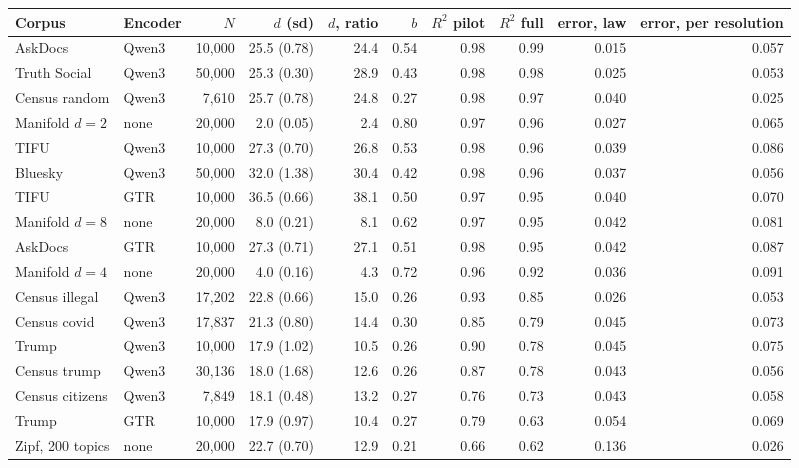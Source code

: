 \begin{table}[t]
\centering
\small
\setlength{\tabcolsep}{5pt}
\begin{tabular}{llrrrrrrrr}
\toprule
Corpus & Encoder & $N$ & $d$ (sd) & $d$, ratio & $b$ & $R^2$ pilot & $R^2$ full & error, law & error, per resolution \\
\midrule
AskDocs & Qwen3 & 10{,}000 & 25.5 (0.78) & 24.4 & 0.54 & 0.98 & 0.99 & 0.015 & 0.057 \\
Truth Social & Qwen3 & 50{,}000 & 25.3 (0.30) & 28.9 & 0.43 & 0.98 & 0.98 & 0.025 & 0.053 \\
Census random & Qwen3 & 7{,}610 & 25.7 (0.78) & 24.8 & 0.27 & 0.98 & 0.97 & 0.040 & 0.025 \\
Manifold $d{=}2$ & none & 20{,}000 & 2.0 (0.05) & 2.4 & 0.80 & 0.97 & 0.96 & 0.027 & 0.065 \\
TIFU & Qwen3 & 10{,}000 & 27.3 (0.70) & 26.8 & 0.53 & 0.98 & 0.96 & 0.039 & 0.086 \\
Bluesky & Qwen3 & 50{,}000 & 32.0 (1.38) & 30.4 & 0.42 & 0.98 & 0.96 & 0.037 & 0.056 \\
TIFU & GTR & 10{,}000 & 36.5 (0.66) & 38.1 & 0.50 & 0.97 & 0.95 & 0.040 & 0.070 \\
Manifold $d{=}8$ & none & 20{,}000 & 8.0 (0.21) & 8.1 & 0.62 & 0.97 & 0.95 & 0.042 & 0.081 \\
AskDocs & GTR & 10{,}000 & 27.3 (0.71) & 27.1 & 0.51 & 0.98 & 0.95 & 0.042 & 0.087 \\
Manifold $d{=}4$ & none & 20{,}000 & 4.0 (0.16) & 4.3 & 0.72 & 0.96 & 0.92 & 0.036 & 0.091 \\
\midrule
Census illegal & Qwen3 & 17{,}202 & 22.8 (0.66) & 15.0 & 0.26 & 0.93 & 0.85 & 0.026 & 0.053 \\
Census covid & Qwen3 & 17{,}837 & 21.3 (0.80) & 14.4 & 0.30 & 0.85 & 0.79 & 0.045 & 0.073 \\
Trump & Qwen3 & 10{,}000 & 17.9 (1.02) & 10.5 & 0.26 & 0.90 & 0.78 & 0.045 & 0.075 \\
Census trump & Qwen3 & 30{,}136 & 18.0 (1.68) & 12.6 & 0.26 & 0.87 & 0.78 & 0.043 & 0.056 \\
Census citizens & Qwen3 & 7{,}849 & 18.1 (0.48) & 13.2 & 0.27 & 0.76 & 0.73 & 0.043 & 0.058 \\
Trump & GTR & 10{,}000 & 17.9 (0.97) & 10.4 & 0.27 & 0.79 & 0.63 & 0.054 & 0.069 \\
Zipf, 200 topics & none & 20{,}000 & 22.7 (0.70) & 12.9 & 0.21 & 0.66 & 0.62 & 0.136 & 0.026 \\
\bottomrule
\end{tabular}

\end{table}
